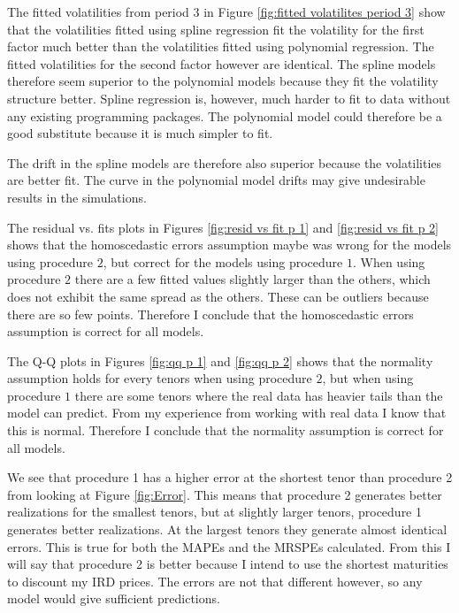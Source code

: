 The fitted volatilities from period $3$ in Figure \ref{fig:fitted volatilites period 3} show that the volatilities fitted using spline regression fit the volatility for the first factor much better than the volatilities fitted using polynomial regression. The fitted volatilities for the second factor however are identical. The spline models therefore seem superior to the polynomial models because they fit the volatility structure better. Spline regression is, however, much harder to fit to data without any existing programming packages. The polynomial model could therefore be a good substitute because it is much simpler to fit.

The drift in the spline models are therefore also superior because the volatilities are better fit. The curve in the polynomial model drifts may give undesirable results in the simulations.

The residual vs. fits plots in Figures \ref{fig:resid vs fit p 1} and \ref{fig:resid vs fit p 2} shows that the homoscedastic errors assumption maybe was wrong for the models using procedure $2$, but correct for the models using procedure $1$. When using procedure $2$ there are a few fitted values slightly larger than the others, which does not exhibit the same spread as the others. These can be outliers because there are so few points. Therefore I conclude that the homoscedastic errors assumption is correct for all models.

The Q-Q plots in Figures \ref{fig:qq p 1} and \ref{fig:qq p 2} shows that the normality assumption holds for every tenors when using procedure $2$, but when using procedure $1$ there are some tenors where the real data has heavier tails than the model can predict. From my experience from working with real data I know that this is normal. Therefore I conclude that the normality assumption is correct for all models.

We see that procedure 1 has a higher error at the shortest tenor than procedure 2 from looking at Figure \ref{fig:Error}. This means that procedure 2 generates better realizations for the smallest tenors, but at slightly larger tenors, procedure 1 generates better realizations. At the largest tenors they generate almost identical errors. This is true for both the MAPEs and the MRSPEs calculated. From this I will say that procedure 2 is better because I intend to use the shortest maturities to discount my IRD prices. The errors are not that different however, so any model would give sufficient predictions.

